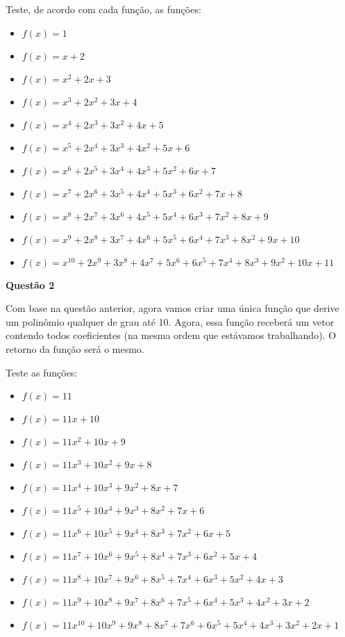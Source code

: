 \documentclass[12pt, a4paper]{article}
\begin{document}
Teste, de acordo com cada função, as funções:

\begin{itemize}
	\item $f(x) = 1$
	\item $f(x) = x + 2$
	\item $f(x) = x^2 + 2x + 3$
	\item $f(x) = x^3 + 2x^2 + 3x + 4$
	\item $f(x) = x^4 + 2x^3 + 3x^2 + 4x + 5$
	\item $f(x) = x^5 + 2x^4 + 3x^3 + 4x^2 + 5x + 6$
	\item $f(x) = x^6 + 2x^5 + 3x^4 + 4x^3 + 5x^2 + 6x + 7$
	\item $f(x) = x^7 + 2x^6 + 3x^5 + 4x^4 + 5x^3 + 6x^2 + 7x + 8$
	\item $f(x) = x^8 + 2x^7 + 3x^6 + 4x^5 + 5x^4 + 6x^3 + 7x^2 + 8x + 9$
	\item $f(x) = x^9 + 2x^8 + 3x^7 + 4x^6 + 5x^5 + 6x^4 + 7x^3 + 8x^2 + 9x + 10$
	\item $f(x) = x^{10} + 2x^9 + 3x^8 + 4x^7 + 5x^6 + 6x^5 + 7x^4 + 8x^3 + 9x^2 + 10x + 11$
\end{itemize}


\textbf{Questão 2}

Com base na questão anterior, agora vamos criar uma única função que derive um polinômio qualquer de grau até 10. Agora, essa função receberá um vetor contendo todos coeficientes (na mesma ordem que estávamos trabalhando). O retorno da função será o mesmo.

Teste as funções:

\begin{itemize}
	\item $f(x) = 11$
	\item $f(x) = 11x + 10$
	\item $f(x) = 11x^2 + 10x + 9$
	\item $f(x) = 11x^3 + 10x^2 + 9x + 8$
	\item $f(x) = 11x^4 + 10x^3 + 9x^2 + 8x + 7$
	\item $f(x) = 11x^5 + 10x^4 + 9x^3 + 8x^2 + 7x + 6$
	\item $f(x) = 11x^6 + 10x^5 + 9x^4 + 8x^3 + 7x^2 + 6x + 5$
	\item $f(x) = 11x^7 + 10x^6 + 9x^5 + 8x^4 + 7x^3 + 6x^2 + 5x + 4$
	\item $f(x) = 11x^8 + 10x^7 + 9x^6 + 8x^5 + 7x^4 + 6x^3 + 5x^2 + 4x + 3$
	\item $f(x) = 11x^9 + 10x^8 + 9x^7 + 8x^6 + 7x^5 + 6x^4 + 5x^3 + 4x^2 + 3x + 2$
	\item $f(x) = 11x^{10} + 10x^9 + 9x^8 + 8x^7 + 7x^6 + 6x^5 + 5x^4 + 4x^3 + 3x^2 + 2x + 1$
\end{itemize}


	
\end{document}
